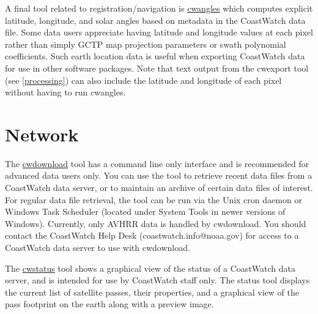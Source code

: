 A final tool related to registration/navigation is
\hyperlink{cwangles}{cwangles} which computes explicit latitude,
longitude, and solar angles based on metadata in the CoastWatch
data file.  Some data users appreciate having latitude and longitude
values at each pixel rather than simply GCTP map projection parameters
or swath polynomial coefficients.  Such earth location data is
useful when exporting CoastWatch data for use in other software
packages.  Note that text output from the cwexport tool (see
\autoref{processing}) can also include the latitude and longitude
of each pixel without having to run cwangles.

\section{Network}

The \hyperlink{cwdownload}{cwdownload} tool has a command line only
interface and is recommended for advanced data users only.  You can
use the tool to retrieve recent data files from a CoastWatch data
server, or to maintain an archive of certain data files of interest.
For regular data file retrieval, the tool can be run via the Unix
cron daemon or Windows Task Scheduler (located under System Tools
in newer versions of Windows).  Currently, only AVHRR data is handled
by cwdownload.  You should contact the CoastWatch Help Desk
(coastwatch.info@noaa.gov) for access to a CoastWatch data server
to use with cwdownload.

The \hyperlink{cwstatus}{cwstatus} tool shows a graphical view of the
status of a CoastWatch data server, and is intended for use by
CoastWatch staff only.  The status tool displays the current list of
satellite passes, their properties, and a graphical view of the pass
footprint on the earth along with a preview image.
